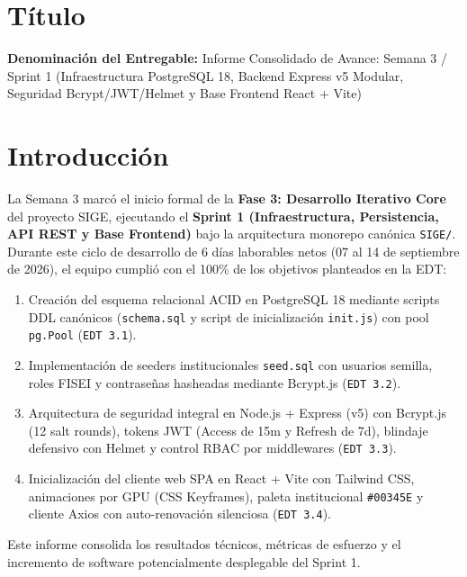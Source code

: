 \documentclass[12pt,a4paper]{article}
\begin{document}
\section{Título}
\textbf{Denominación del Entregable:} Informe Consolidado de Avance: Semana 3 / Sprint 1 (Infraestructura PostgreSQL 18, Backend Express v5 Modular, Seguridad Bcrypt/JWT/Helmet y Base Frontend React + Vite)



\section{Introducción}
La Semana 3 marcó el inicio formal de la \textbf{Fase 3: Desarrollo Iterativo Core} del proyecto SIGE, ejecutando el \textbf{Sprint 1 (Infraestructura, Persistencia, API REST y Base Frontend)} bajo la arquitectura monorepo canónica \texttt{SIGE/}. Durante este ciclo de desarrollo de 6 días laborables netos (07 al 14 de septiembre de 2026), el equipo cumplió con el 100\% de los objetivos planteados en la EDT:
\begin{enumerate}[leftmargin=1.5em, itemsep=1.5pt]
    \item Creación del esquema relacional ACID en PostgreSQL 18 mediante scripts DDL canónicos (\texttt{schema.sql} y script de inicialización \texttt{init.js}) con pool \texttt{pg.Pool} (\texttt{EDT 3.1}).
    \item Implementación de seeders institucionales \texttt{seed.sql} con usuarios semilla, roles FISEI y contraseñas hasheadas mediante Bcrypt.js (\texttt{EDT 3.2}).
    \item Arquitectura de seguridad integral en Node.js + Express (v5) con Bcrypt.js (12 salt rounds), tokens JWT (Access de 15m y Refresh de 7d), blindaje defensivo con Helmet y control RBAC por middlewares (\texttt{EDT 3.3}).
    \item Inicialización del cliente web SPA en React + Vite con Tailwind CSS, animaciones por GPU (CSS Keyframes), paleta institucional \texttt{\#00345E} y cliente Axios con auto-renovación silenciosa (\texttt{EDT 3.4}).
\end{enumerate}

Este informe consolida los resultados técnicos, métricas de esfuerzo y el incremento de software potencialmente desplegable del Sprint 1.
\end{document}
